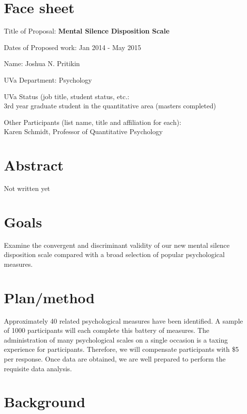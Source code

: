\documentclass[12pt]{article}
\begin{document}
\setlength{\parindent}{0cm}
\setlength{\parskip}{1cm plus4mm minus3mm}

\section{Face sheet}

Title of Proposal: \textbf{Mental Silence Disposition Scale}

Dates of Proposed work: Jan 2014 - May 2015

Name: Joshua N. Pritikin

UVa Department: Psychology

UVa Status (job title, student status, etc.: \\
3rd year graduate student in the quantitative area (masters completed)

Other Participants (list name, title and affiliation for each): \\
Karen Schmidt, Professor of Quantitative Psychology

\break

\setlength{\parskip}{1ex plus2mm minus1mm}

\section{Abstract}

Not written yet

\section{Goals}

Examine the convergent and discriminant validity of our new mental
silence disposition scale compared with a broad selection of popular
psychological measures.

\section{Plan/method}

Approximately 40 related psychological measures have been identified.
A sample of 1000 participants will each complete this battery of measures.
The administration of many psychological scales on a single occasion
is a taxing experience for participants. 
Therefore, we will compensate participants with \$5 per response.
Once data are obtained,
we are well prepared to perform the requisite data analysis.

\section{Background}
\end{document}

